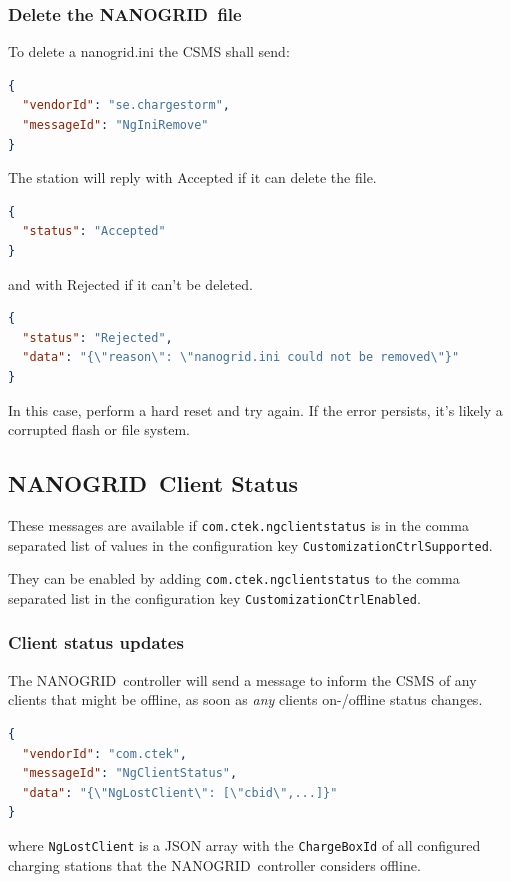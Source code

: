 \documentclass{scrartcl}
\newcommand{\nanogrid}{NANOGRID\texttrademark}
\begin{document}
\subsubsection{Delete the \nanogrid\ file}
\label{sec:delete-nanogrid-file}


To delete a  nanogrid.ini the CSMS shall send:
\begin{lstlisting}[language=json,caption={DataTransfer.req for NgIniRemove
sent to the CS},captionpos=t]
{
  "vendorId": "se.chargestorm",
  "messageId": "NgIniRemove"
}
\end{lstlisting}
The station will reply with Accepted if it can delete the file.
\begin{lstlisting}[language=json,caption={DataTransfer.conf for NgIniRemove
sent from the CS},captionpos=t]
{
  "status": "Accepted"
}
\end{lstlisting}
and with Rejected if it can't be deleted.
\begin{lstlisting}[language=json,caption={DataTransfer.conf for NgIniRemove
sent from the CS},captionpos=t]
{
  "status": "Rejected",
  "data": "{\"reason\": \"nanogrid.ini could not be removed\"}"
}
\end{lstlisting}
In this case, perform a hard reset and try again. If the error persists, it's
likely a corrupted flash or file system.


\subsection{\nanogrid\ Client Status}
\label{sec:nanogr-client-stat}

These messages are available if \verb|com.ctek.ngclientstatus| is in the comma
separated list of values in the configuration key
\verb|CustomizationCtrlSupported|.

They can be enabled by adding \verb|com.ctek.ngclientstatus| to the
comma separated list in the configuration key
\verb|CustomizationCtrlEnabled|.


\subsubsection{Client status updates}
\label{sec:client-stat-updat}

The \nanogrid\ controller will send a message to inform the CSMS of any
clients that might be offline, as soon as \emph{any} clients on-/offline
status changes.

\begin{lstlisting}[language=json,caption={DataTransfer.req for NgClientStatus
sent from the CS},captionpos=t]
{
  "vendorId": "com.ctek",
  "messageId": "NgClientStatus",
  "data": "{\"NgLostClient\": [\"cbid\",...]}"
}
\end{lstlisting}
where \verb|NgLostClient| is a JSON array with the \verb|ChargeBoxId| of all
configured charging stations that the \nanogrid\ controller considers offline.
\end{document}
